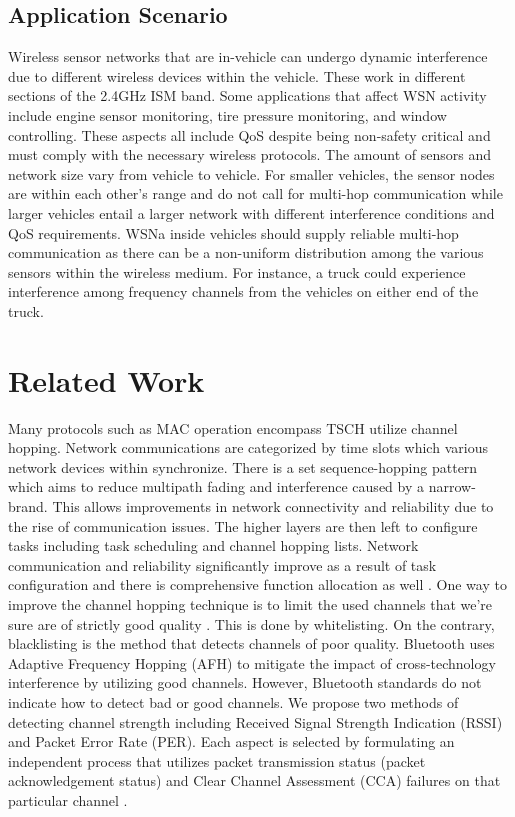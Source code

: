 \documentclass[acmsmall, authorversion]{acmart}
\begin{document}
\subsection{Application Scenario}
Wireless sensor networks that are in-vehicle can undergo  dynamic interference due to different wireless devices within the vehicle. These work in different sections of the 2.4GHz ISM band. Some applications that affect WSN activity include engine sensor monitoring, tire pressure monitoring, and window controlling. These aspects all include QoS despite being non-safety critical and must comply with the necessary wireless protocols. The amount of sensors and network size vary from vehicle to vehicle. For smaller vehicles, the sensor nodes are within each other's range and do not call for multi-hop communication while larger vehicles entail a larger network with different interference conditions and QoS requirements. WSNa inside vehicles should supply reliable multi-hop communication as there can be a non-uniform distribution among the various sensors within the wireless medium. For instance, a truck could experience interference among frequency channels from the vehicles on either end of the truck.

\section{Related Work}

Many protocols such as MAC operation encompass TSCH utilize channel hopping. Network communications are categorized by time slots which various network devices within synchronize. There is a set sequence-hopping pattern which aims to reduce multipath fading and interference caused by a narrow-brand. This allows improvements in network connectivity and reliability due to the rise of communication issues. The higher layers are then left to configure tasks including task scheduling and channel hopping lists. Network communication and reliability significantly improve as a result of task configuration and there is comprehensive function allocation as well \cite{jeon}.
One way to improve the channel hopping technique is to limit the used channels that we're sure are of strictly good quality \cite{de}. This is done by whitelisting. On the contrary, blacklisting is the method that detects channels of poor quality. Bluetooth uses Adaptive Frequency Hopping (AFH) to mitigate the impact of cross-technology interference by utilizing good channels. However, Bluetooth standards do not indicate how to detect bad or good channels. We propose two methods of detecting channel strength including Received Signal Strength Indication (RSSI) and Packet Error Rate (PER). Each aspect is selected by formulating an independent process that utilizes packet transmission status (packet acknowledgement status) and Clear Channel Assessment (CCA) failures on that particular channel \cite{els}.
\end{document}
